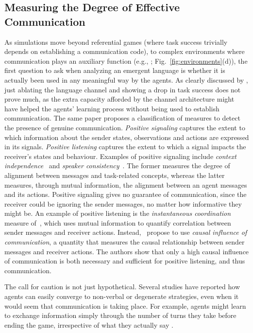 \subsection{Measuring the Degree of Effective Communication}
\label{sec:measuring-communication}
  As simulations move beyond referential games (where task success
  trivially depends on establishing a communication code), to complex
  environments where communication plays an auxiliary function (e.g.,
  ; Fig.~\ref{fig:environments}(d)), the first
   question to ask when analyzing an emergent language is whether
  it is actually been used in any meaningful way by the agents.  As
  clearly discussed by , just ablating the
  language channel and showing a drop in task success does not prove
  much, as the extra capacity afforded by the channel architecture
  might have helped the agents' learning process without being used to
  establish communication. The same paper proposes a classification of
  measures to detect the presence of genuine
  communication. \textit{Positive signaling} captures the extent to
  which information about the sender states, observations and actions
  are expressed in its signals. \textit{Positive listening} captures
  the extent to which a signal impacts the receiver's states and
  behaviour. Examples of positive signaling include \textit{context
    independence}~\cite{Bogin:etal:2018} and \textit{speaker
    consistency}~\cite{Jaques:etal:2019}. The former measures the
  degree of alignment between messages and task-related concepts,
  whereas the latter measures, through mutual information, the
  alignment between an agent messages and its actions. Positive
  signaling gives no guarantee of communication, since the receiver could
  be ignoring the sender messages, no matter how informative they might
  be. An example of positive listening is the \textit{instantaneous
    coordination} measure of~, which uses
  mutual information to quantify correlation between 
  sender messages and receiver actions. Instead,~
  propose to use \emph{causal influence of communication}, a
  quantity that measures the causal relationship between sender
  messages and receiver actions.   The authors show that only a high causal influence
  of communication is both necessary and sufficient for
  positive listening, and thus communication.

  The call for caution
  is not just hypothetical. Several studies have reported how agents
  can easily converge to non-verbal or degenerate strategies, even
  when it would seem that communication is taking place. For example,
   agents might learn to exchange information simply through the
  number of turns they take before ending the game, irrespective of
  what they actually say
  \cite{Cao:etal:2018,Bouchacourt:Baroni:2019}.

